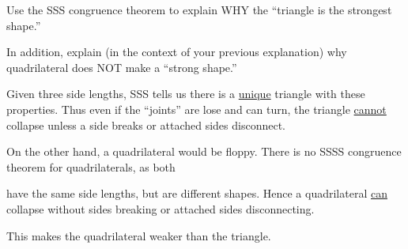 \documentclass[noauthor,nooutcomes]{ximera}
\begin{document}
\begin{question}
  Use the SSS congruence theorem to explain WHY the ``triangle is the
  strongest shape.''

  

  In addition, explain (in the context of your previous explanation)
  why quadrilateral does NOT make a ``strong shape.''
  \begin{freeResponse}
    Given three side lengths, SSS tells us there is a
    \underline{unique} triangle with these properties. Thus even if
    the ``joints'' are lose and can turn, the triangle
    \underline{cannot} collapse unless a side breaks or attached
    sides disconnect.

    
    On the other hand, a quadrilateral would be floppy. There is no
    SSSS congruence theorem for quadrilaterals, as both

    \begin{center}
    \end{center}
    have the same side lengths, but are different shapes. Hence a
    quadrilateral \underline{can} collapse without sides breaking or
    attached sides disconnecting.

    This makes the quadrilateral weaker than the triangle.
  \end{freeResponse}
\end{question}
\end{document}
